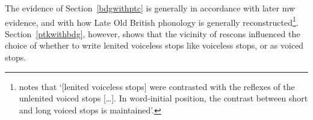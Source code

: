 The evidence of Section~\ref{bdgwithptc} is generally in accordance with later \gls{mw} evidence, and with how Late Old British phonology is generally reconstructed\footnote{\Textcite[31]{schrijver_old_2011} notes that `[lenited voiceless stops] were contrasted with the reflexes of the unlenited voiced stops […]. In word-initial position, the contrast between short and long voiced stops is maintained'.}. Section~\ref{ptkwithbdg}, however, shows that the vicinity of \gls{rescon}s influenced the choice of whether to write lenited voiceless stops like voiceless stops, or as voiced stops.






